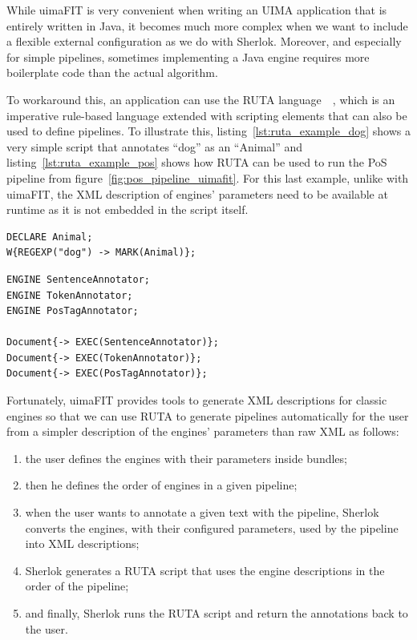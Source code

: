 \documentclass{article}
\begin{document}
While uimaFIT is very convenient when writing an UIMA application that is entirely written in Java,
it becomes much more complex when we want to include a flexible external configuration as we do with
Sherlok. Moreover, and especially for simple pipelines, sometimes implementing a Java engine
requires more boilerplate code than the actual algorithm.

To workaround this, an application can use the RUTA language~\cite{ruta}~\cite{ruta_2014}, which is
an imperative rule-based language extended with scripting elements that can also be used to define
pipelines. To illustrate this, listing~\ref{lst:ruta_example_dog} shows a very simple script that
annotates ``dog'' as an ``Animal'' and listing~\ref{lst:ruta_example_pos} shows how RUTA can be used
to run the PoS pipeline from figure~\ref{fig:pos_pipeline_uimafit}. For this last example, unlike
with uimaFIT, the XML description of engines' parameters need to be available at runtime as it is
not embedded in the script itself.

\begin{lstlisting}[float,language=ruta,
                   caption=A basic RUTA script,
                   label=lst:ruta_example_dog]
DECLARE Animal;
W{REGEXP("dog") -> MARK(Animal)};
\end{lstlisting}

\begin{lstlisting}[float,language=ruta,
                   caption=PoS pipeline written in RUTA,
                   label=lst:ruta_example_pos]
ENGINE SentenceAnnotator;
ENGINE TokenAnnotator;
ENGINE PosTagAnnotator;

Document{-> EXEC(SentenceAnnotator)};
Document{-> EXEC(TokenAnnotator)};
Document{-> EXEC(PosTagAnnotator)};
\end{lstlisting}

Fortunately, uimaFIT provides tools to generate XML descriptions for classic engines so that we can
use RUTA to generate pipelines automatically for the user from a simpler description of the engines'
parameters than raw XML as follows:

\begin{enumerate}

    \item the user defines the engines with their parameters inside bundles;

    \item then he defines the order of engines in a given pipeline;

    \item when the user wants to annotate a given text with the pipeline, Sherlok converts the
        engines, with their configured parameters, used by the pipeline into XML descriptions;

    \item Sherlok generates a RUTA script that uses the engine descriptions in the order of the
        pipeline;

    \item and finally, Sherlok runs the RUTA script and return the annotations back to the user.
\end{enumerate}
\end{document}
